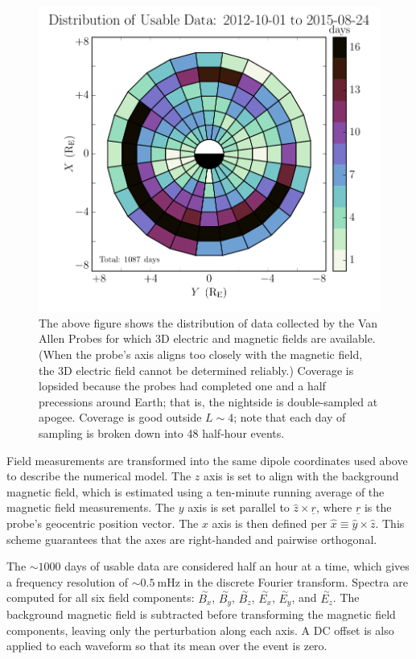 \documentclass[draft,linenumbers]{agujournal}
\begin{document}
\begin{figure}
    \begin{center}
    \includegraphics[width=\textwidth]{figures/fig_pos.pdf}
    \caption{
        The above figure shows the distribution of data collected by the Van Allen Probes for which 3D electric and magnetic fields are available. (When the probe's axis aligns too closely with the magnetic field, the 3D electric field cannot be determined reliably.) Coverage is lopsided because the probes had completed one and a half precessions around Earth; that is, the nightside is double-sampled at apogee. Coverage is good outside $L\sim4$; note that each day of sampling is broken down into 48 half-hour events.
    }
    \label{fig_pos}
    \end{center}
\end{figure}

Field measurements are transformed into the same dipole coordinates used above to describe the numerical model. The $z$ axis is set to align with the background magnetic field, which is estimated using a ten-minute running average of the magnetic field measurements. The $y$ axis is set parallel to $\hat{z} \times \underline{r}$, where $\underline{r}$ is the probe's geocentric position vector. The $x$ axis is then defined per $\hat{x} \equiv \hat{y} \times \hat{z}$. This scheme guarantees that the axes are right-handed and pairwise orthogonal\citep{liu_2009}.

The $\sim1000$ days of usable data are considered half an hour at a time, which gives a frequency resolution of $\sim\SI{0.5}{\mHz}$ in the discrete Fourier transform. Spectra are computed for all six field components: $\overset{\sim}{B_x}$, $\overset{\sim}{B_y}$, $\overset{\sim}{B_z}$, $\overset{\sim}{E_x}$, $\overset{\sim}{E_y}$, and $\overset{\sim}{E_z}$. The background
magnetic field is subtracted before transforming the magnetic field components, leaving only the perturbation along each axis. A DC offset is also applied to each waveform so that its mean over the event is zero.
\end{document}

